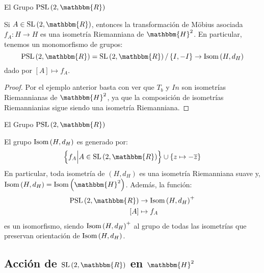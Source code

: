 \documentclass[xcolor=dvipsnames]{beamer}
\theoremstyle{largebreak}
\newcommand\cf[3]{\ensuremath{#1:#2\rightarrow#3}}
\newcommand{\bbm}[1]{\ensuremath{\mathbbm{#1}}}
\newcommand{\Isom}[1]{\ensuremath{\textup{Isom}\left(#1\right)}}
\newcommand{\SL}[1]{\ensuremath{\textup{SL}\left(#1\right)}}
\newcommand{\PSL}[1]{\ensuremath{\textup{PSL}\left(#1\right)}}
\begin{document}
\begin{frame}{El Grupo $\PSL{2,\bbm{R}}$}
    \begin{propo}
        Si $A\in\SL{2,\bbm{R}}$, entonces la transformación de Möbius asociada $\cf{f_A}{H}{H}$ es una isometría Riemanniana de $\bbm{H}^2$. En particular, tenemos un monomorfismo de grupos:
        \begin{equation*}
            \PSL{2,\bbm{R}}=\SL{2,\bbm{R}}/\left\{I,-I \right\}\rightarrow\Isom{H,d_H}
        \end{equation*}
        dado por $[A]\mapsto f_A$.
    \end{propo}

    \begin{proof}
        Por el ejemplo anterior basta con ver que $T_b$ y $In$ son isometrías Riemannianas de $\bbm{H}^2$, ya que la composición de isometrías Riemannianias sigue siendo una isometría Riemanniana.
    \end{proof}
\end{frame}

\begin{frame}{El Grupo $\PSL{2,\bbm{R}}$}
    \begin{theor}
        El grupo $\Isom{H,d_H}$ es generado por:
        \begin{equation*}
            \left\{f_A\Big|A\in\SL{2,\bbm{R}} \right\}\cup\left\{z\mapsto-\overline{z} \right\}
        \end{equation*}
        En particular, toda isometría de $(H,d_H)$ es una isometría Riemanniana suave y, $\Isom{H,d_H}=\Isom{\bbm{H}^2}$. Además, la función:
        \begin{equation*}
            \begin{split}
                \PSL{2,\bbm{R}}&\rightarrow\Isom{H,d_H}^+\\
                [A]&\mapsto f_A\\
            \end{split}
        \end{equation*}
        es un isomorfismo, siendo $\Isom{H,d_H}^+$ al grupo de todas las isometrías que preservan orientación de $\Isom{H,d_H}$.
    \end{theor}
\end{frame}

\subsection{Acción de $\SL{2,\bbm{R}}$ en $\bbm{H}^2$}
\end{document}
